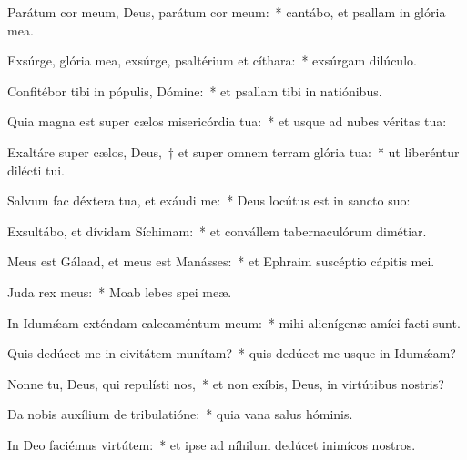 \item Parátum cor meum, Deus, parátum cor meum:~* cantábo, et psallam in glória mea.

\item Exsúrge, glória mea, exsúrge, psaltérium et cíthara:~* exsúrgam dilúculo.

\item Confitébor tibi in pópulis, Dómine:~* et psallam tibi in natiónibus.

\item Quia magna est super cælos misericórdia tua:~* et usque ad nubes véritas tua:

\item Exaltáre super cælos, Deus,~† et super omnem terram glória tua:~* ut liberéntur dilécti tui.

\item Salvum fac déxtera tua, et exáudi me:~* Deus locútus est in sancto suo:

\item Exsultábo, et dívidam Síchimam:~* et convállem tabernaculórum dimétiar.

\item Meus est Gálaad, et meus est Manásses:~* et Ephraim suscéptio cápitis mei.

\item Juda rex meus:~* Moab lebes spei meæ.

\item In Idumǽam exténdam calceaméntum meum:~* mihi alienígenæ amíci facti sunt.

\item Quis dedúcet me in civitátem munítam?~* quis dedúcet me usque in Idumǽam?

\item Nonne tu, Deus, qui repulísti nos,~* et non exíbis, Deus, in virtútibus nostris?

\item Da nobis auxílium de tribulatióne:~* quia vana salus hóminis.

\item In Deo faciémus virtútem:~* et ipse ad níhilum dedúcet inimícos nostros.
